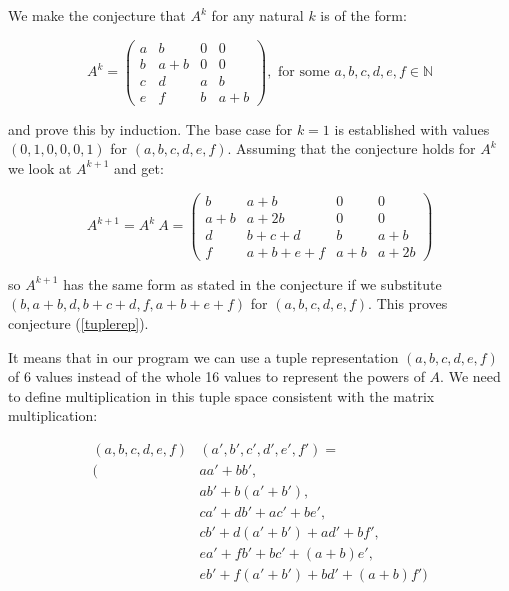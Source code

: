 We make the conjecture that $A^k$ for any natural $k$ is of the form:

\begin{equation}\label{tuplerep}
A^k = 
\begin{pmatrix}
       a & b & 0 & 0\\
       b & a + b & 0 & 0\\
       c & d & a & b\\
       e & f & b & a + b
       \end{pmatrix}, \text{ for some } a, b, c, d, e, f \in \mathbb{N}
\end{equation}

and prove this by induction. The base case for $k = 1$ is established with values $(0, 1, 0 , 0, 0 ,1)$ for $(a, b, c, d, e, f)$. Assuming that the conjecture holds for $A^k$ we look at $A^{k + 1}$ and get:

\begin{equation*}
A^{k + 1} = A^k\ A = 
\begin{pmatrix}
       b & a + b & 0 & 0\\
       a + b & a + 2 b & 0 & 0\\
       d & b + c + d & b & a + b\\
       f & a + b + e + f & a + b & a + 2 b
       \end{pmatrix}
\end{equation*}

so $A^{k + 1}$ has the same form as stated in the conjecture if we substitute $(b, a + b, d, b + c + d, f, a + b + e + f)$  for $(a, b, c, d, e, f)$. This proves conjecture (\ref{tuplerep}).

It means that in our program we can use a tuple representation $(a, b, c, d, e, f)$ of 6 values instead of the whole 16 values to represent the powers of $A$. We need to define multiplication in this tuple space consistent with the matrix multiplication:

\begin{equation*}
\begin{split}
(a, b, c, d, e, f) & (a', b', c', d', e',f') =  \\ 
( & a a' + b b', \\
   & a b' + b (a' + b'), \\
   & c a' + d b' + a c' + b e', \\
   & c b' + d (a' + b') + a d' + b f', \\
   & e a' + f b' + b c' + (a + b) e', \\
   & e b' + f (a' + b') + b d' + (a + b) f' )
\end{split}   
\end{equation*}

